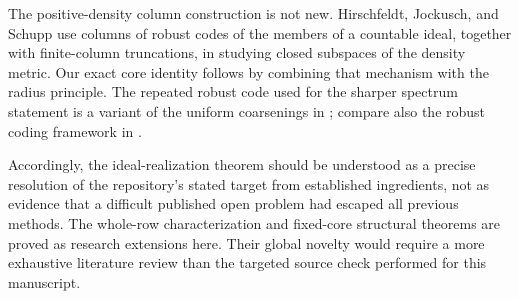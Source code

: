 \documentclass[11pt,letterpaper]{article}
\theoremstyle{plain}
\theoremstyle{definition}
\theoremstyle{remark}
\numberwithin{equation}{section}
\begin{document}
The positive-density column construction is not new. Hirschfeldt, Jockusch,
and Schupp \cite[Lemma~3.10 and Theorem~3.11]{HJS} use columns of robust codes of
the members of a countable ideal, together with finite-column truncations, in
studying closed subspaces of the density metric. Our exact core identity follows
by combining that mechanism with the radius principle. The repeated robust code
used for the sharper spectrum statement is a variant of the uniform coarsenings
in \cite[Section~2]{HJKS}; compare also the robust coding framework in
\cite{DI}.

Accordingly, the ideal-realization theorem should be understood as a precise
resolution of the repository's stated target from established ingredients,
not as evidence that a difficult published open problem had escaped all previous
methods. The whole-row characterization and fixed-core structural theorems are
proved as research extensions here. Their global novelty would require a more
exhaustive literature review than the targeted source check performed for this
manuscript.
\end{document}
